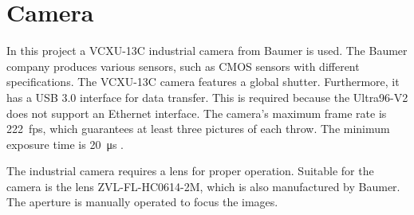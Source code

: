 \section{Camera}
\label{sec:hardware:camera}

In this project a VCXU-13C industrial camera from Baumer is used.
The Baumer company produces various sensors, such as CMOS sensors with different specifications.
The VCXU-13C camera features a global shutter.
Furthermore, it has a USB 3.0 interface for data transfer.
This is required because the Ultra96-V2 does not support an Ethernet interface.
The camera's maximum frame rate is \SI{222}{fps}, which guarantees at least three pictures of each throw.
The minimum exposure time is \SI{20}{\micro s} \cite{baumer_cam}.

The industrial camera requires a lens for proper operation.
Suitable for the camera is the lens ZVL-FL-HC0614-2M, which is also manufactured by Baumer.
The aperture is manually operated to focus the images.
